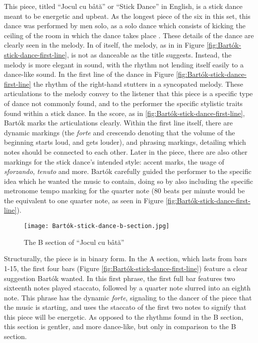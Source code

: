 This piece, titled ``Jocul cu bâtă'' or ``Stick Dance'' in English, is a stick dance meant to be energetic and upbeat. As the longest piece of the six in this set, this dance was performed by men solo, as a solo dance which consists of kicking the ceiling of the room in which the dance takes place \autocite{Weissmann_1969}. These details of the dance are clearly seen in the melody. In of itself, the melody, as in  in Figure \ref{fig:Bartók-stick-dance-first-line}\autocite{Lung_2016}, is not as danceable as the title suggests. Instead, the melody is more elegant in sound, with the rhythm not lending itself easily to a dance-like sound. In the first line of the dance in Figure \ref{fig:Bartók-stick-dance-first-line}\autocite{Lung_2016} the rhythm of the right-hand stutters in a syncopated melody. These articulations to the melody convey to the listener that this piece is a specific type of dance not commonly found, and to the performer the specific stylistic traits found within a stick dance. In the score, as in \ref{fig:Bartók-stick-dance-first-line}\autocite{Lung_2016}, Bartók marks the articulations clearly. Within the first line itself, there are dynamic markings (the \textit{forte} and crescendo denoting that the volume of the beginning starts loud, and gets louder), and phrasing markings, detailing which notes should be connected to each other. Later in the piece, there are also other markings for the stick dance's intended style: accent marks, the usage of \textit{sforzando}, \textit{tenuto} and more. Bartók carefully guided the performer to the specific idea which he wanted the music to contain, doing so by also including the specific metronome tempo marking for the quarter note (80 beats per minute would be the equivalent to one quarter note, as seen in Figure \ref{fig:Bartók-stick-dance-first-line}\autocite{Lung_2016}).

\begin{figure}
  \centering
  \texttt{[image: Bartók-stick-dance-b-section.jpg]}
  \caption[The B Section, of ``Jocul cu bâtă'' in Bartók's \textit{Romanian Folk Dances, Sz. 56, BB 68}]{The B section of ``Jocul cu bâtă''}
  \label{fig:Bartók-stick-dance-b-section}
\end{figure}


Structurally, the piece is in binary form. In the A section, which lasts from bars 1-15, the first four bars (Figure \ref{fig:Bartók-stick-dance-first-line}\autocite{Lung_2016}) feature a clear suggestion Bartók wanted. In this first phrase, the first full bar features two sixteenth notes played staccato, followed by a quarter note slurred into an eighth note. This phrase has the dynamic \textit{forte}, signaling to the dancer of the piece that the music is starting, and uses the staccato of the first two notes to signify that this piece will be energetic. As opposed to the rhythms found in the B section, this section is gentler, and more dance-like, but only in comparison to the B section. 

